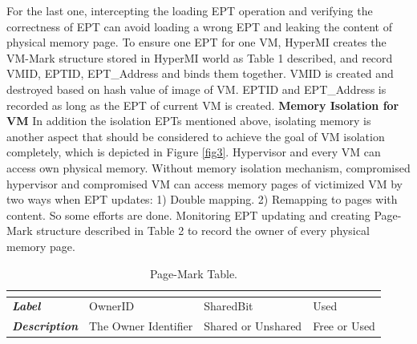 \documentclass[conference]{IEEEtran}
\begin{document}
For the last one, intercepting the loading EPT operation and verifying the correctness of EPT can avoid loading a wrong EPT and leaking the content of physical memory page. To ensure one EPT for one VM, HyperMI creates the VM-Mark structure stored in HyperMI world as Table 1 described, and record VMID, EPTID, EPT\_Address and binds them together. VMID is created and destroyed based on hash value of image of VM. EPTID and EPT\_Address is recorded as long as the EPT of current VM is created.
\textbf{Memory Isolation for VM }
In addition the isolation EPTs mentioned above, isolating memory is another aspect that should be considered to achieve the goal of VM isolation completely, which is depicted in Figure \ref{fig3}. 
Hypervisor and every VM can access own physical memory. Without memory isolation mechanism, compromised hypervisor and compromised VM can access memory pages of victimized VM by two ways when EPT updates: 1) Double mapping. 2) Remapping to pages with content. So some efforts are done. Monitoring EPT updating and creating Page-Mark structure described in Table 2 to record the owner of every physical memory page. 
\begin{table}
\centering
\caption{Page-Mark Table.}\label{tab2}
\begin{tabular}{p{1.2cm}|p{1.4cm}|p{1.2cm}|p{1.5cm}}
\hline
\multicolumn{4}{c}{\bfseries\textbf\centering{Page-Mark Table}}\\
\hline
{\itshape\bfseries Label} & OwnerID & SharedBit & Used \\
\hline
{\itshape\bfseries Description} & The Owner Identifier & Shared or Unshared & Free or Used \\
\hline
\end{tabular}
\end{table}
\end{document}
